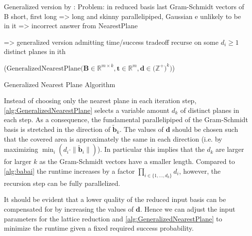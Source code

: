 {Generalized version by \cite{LP11}:
Problem: in reduced basis last Gram-Schmidt vectors of B short, first long => long and skinny parallelipiped, Gaussian e unlikely to be in it => incorrect answer from NearestPlane

=> generalized version admitting time/success tradeoff
recurse on some $d_i \geq 1$ distinct planes in ith 

\begin{algorithm2e}
  \Begin($\text{GeneralizedNearestPlane} {(} \mathbf{B} \in \mathbb{R}^{m \times k},\mathbf{t} \in \mathbb{R}^{m}, \mathbf{d} \in {(}\mathbb{Z}^+{)}^k {)}$) 
  { %
  }
\caption{Generalized Nearest Plane Algorithm \cite{LP11}}\label{alg:GeneralizedNearestPlane}
\end{algorithm2e}
Instead of choosing only the nearest plane in each iteration step, \cref{alg:GeneralizedNearestPlane} selects a variable amount $d_k$ of distinct planes in each step. As a consequence, the fundamental parallelipiped of the Gram-Schmidt basis is stretched in the direction of $\tilde{\mathbf{b}}_k$. The values of $\mathbf{d}$ should be chosen such that the covered area is approximately the same in each direction (i.e. by maximizing $\min_i(d_i \cdot \|\tilde{\mathbf{b}}_i\|)$). In particular this implies that the $d_k$ are larger for larger $k$ as the Gram-Schmidt vectors have a smaller length. %
Compared to \cref{alg:babai} the runtime increases by a factor $\prod_{i \in \{1, \dots, d_k\}} d_i$, however, the recursion step can be fully parallelized.

It should be evident that a lower quality of the reduced input basis can be compensated for by increasing the values of $\mathbf{d}$. Hence we can adjust the input parameters for the lattice reduction and \cref{alg:GeneralizedNearestPlane} to minimize the runtime given a fixed required success probability. %




}
